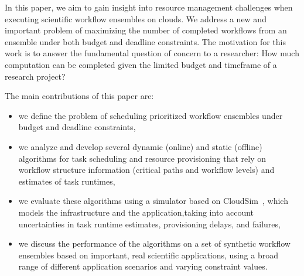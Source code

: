 \documentclass[conference]{IEEEtran}
\begin{document}
In this paper, we aim to gain insight into resource management challenges when
executing scientific workflow ensembles on clouds. We address a
new and important problem of maximizing the number of completed workflows from
an ensemble under both budget and deadline constraints. The motivation for this
work is to answer the fundamental question of concern to a researcher: How much
computation can be completed given the limited budget and timeframe of a
research project? 

The main contributions of this paper are:
\begin{itemize}
  \item we define the problem of scheduling prioritized workflow ensembles
  under budget and deadline constraints,
  \item we analyze and develop several dynamic (online) and static (offline) 
  algorithms for task scheduling and resource provisioning that rely on workflow 
  structure information (critical paths and workflow levels) and estimates of 
  task runtimes,
  \item we evaluate these algorithms using a simulator based on 
  CloudSim~\cite{Calheiros2011}, which models the infrastructure and the 
  application,taking into account uncertainties in task runtime estimates, 
  provisioning delays, and failures, 
  \item we discuss the performance of the algorithms on a set of
  synthetic workflow ensembles based on important, real scientific
  applications, using a broad range of different application scenarios and
  varying constraint values.
\end{itemize}

\end{document}
